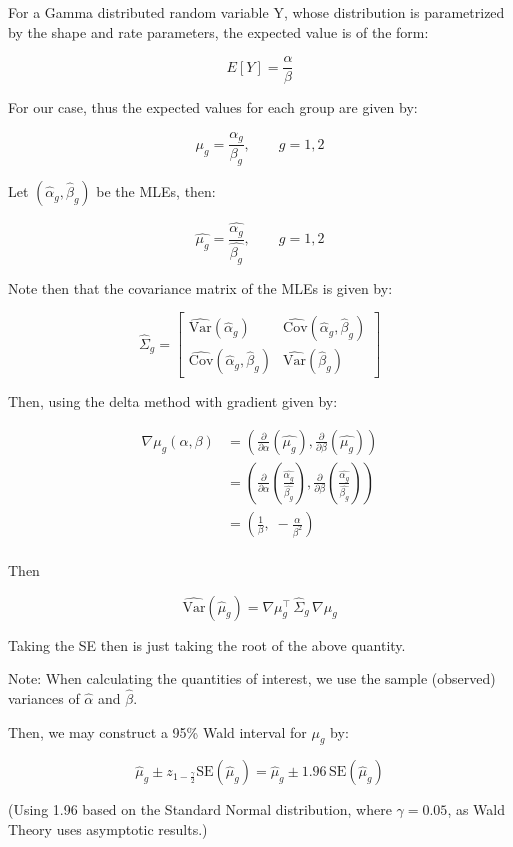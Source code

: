 \documentclass[
]{article}
\begin{document}
For a Gamma distributed random variable Y, whose distribution is
parametrized by the shape and rate parameters, the expected value is of
the form:

\[
E[Y] = \frac{\alpha}{\beta}
\]

For our case, thus the expected values for each group are given by:

\[
\mu_g = \frac{\alpha_g}{\beta_g},\qquad g=1,2
\]

Let \((\hat\alpha_g,\hat\beta_g)\) be the MLEs, then:

\[
\hat{\mu_g} = \frac{\hat{\alpha_g}}{\hat{\beta_g}},\qquad g=1,2
\]

Note then that the covariance matrix of the MLEs is given by:

\[
\widehat\Sigma_g = \begin{bmatrix}\widehat{\mathrm{Var}}(\hat\alpha_g) & \widehat{\mathrm{Cov}}(\hat\alpha_g,\hat\beta_g)\\ \widehat{\mathrm{Cov}}(\hat\alpha_g,\hat\beta_g) & \widehat{\mathrm{Var}}(\hat\beta_g)\end{bmatrix}
\]

Then, using the delta method with gradient given by:

\[
\begin{aligned}
\nabla\mu_g(\alpha,\beta) 
&= (\frac{\partial}{\partial \alpha} (\hat{\mu_g}), \frac{\partial}{\partial \beta} (\hat{\mu_g})) \\ 
&= (\frac{\partial}{\partial \alpha} (\frac{\hat{\alpha_g}}{\hat{\beta_g}}), \frac{\partial}{\partial \beta} (\frac{\hat{\alpha_g}}{\hat{\beta_g}})) \\ 
&= \left(\tfrac{1}{\beta},\; -\tfrac{\alpha}{\beta^2}\right) \\ 
\end{aligned}
\]

Then

\[
\widehat{\mathrm{Var}}(\hat\mu_g)
= \nabla\mu_g^\top \,\widehat\Sigma_g \,\nabla\mu_g
\]

Taking the SE then is just taking the root of the above quantity.

Note: When calculating the quantities of interest, we use the sample
(observed) variances of \(\hat{\alpha}\) and \(\hat{\beta}\).

Then, we may construct a 95\% Wald interval for \(\mu_g\) by:

\[
\hat\mu_g \pm z_{1 - \frac{\gamma}{2}} \mathrm{SE}(\hat\mu_g)
= \hat\mu_g \pm 1.96\,\mathrm{SE}(\hat\mu_g)
\]

(Using 1.96 based on the Standard Normal distribution, where
\(\gamma = 0.05\), as Wald Theory uses asymptotic results.)
\end{document}
